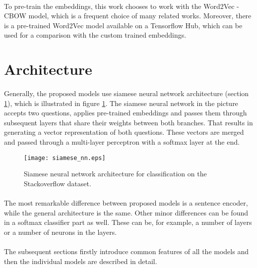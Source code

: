\paragraph{}
To pre-train the embeddings, this work chooses to work with the Word2Vec - CBOW model, which is a frequent choice of many related works. Moreover, there is a pre-trained Word2Vec model available on a Tensorflow Hub, which can be used for a comparison with the custom trained embeddings.


\section{Architecture}
\paragraph{}
Generally, the proposed models use siamese neural network architecture (section \ref{siamese_nn}), which is illustrated in figure \ref{siamese_nn}. The siamese neural network in the picture accepts two questions, applies pre-trained embeddings and passes them through subsequent layers that share their weights between both branches. That results in generating a vector representation of both questions. These vectors are merged and passed through a multi-layer perceptron with a softmax layer at the end.

\begin{figure}[!h]
	\texttt{[image: siamese\_nn.eps]}
	\centering
	\caption{Siamese neural network architecture for classification on the Stackoverflow dataset.}
	\label{siamese_nn}
\end{figure}

\paragraph{}
The most remarkable difference between proposed models is a sentence encoder, while the general architecture is the same. Other minor differences can be found in a softmax classifier part as well. These can be, for example, a number of layers or a number of neurons in the layers.

\paragraph{}
The subsequent sections firstly introduce common features of all the models and then the individual models are described in detail.

